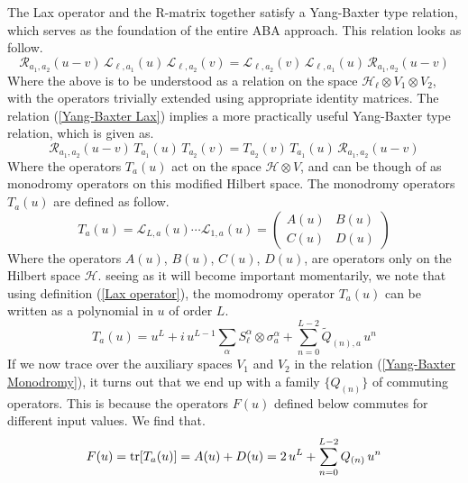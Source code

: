 %
%
The Lax operator and the R-matrix together satisfy a Yang-Baxter type relation, which serves as the foundation of the entire ABA approach. This relation looks as follow.
%
%
\begin{equation}\label{Yang-Baxter Lax}
\mathcal{R}_{a_1,a_2}(u - v) \, \mathcal{L}_{\ell,a_1}(u) \, \mathcal{L}_{\ell,a_2}(v)
=
\mathcal{L}_{\ell,a_2}(v) \, \mathcal{L}_{\ell,a_1}(u) \, \mathcal{R}_{a_1,a_2}(u - v)
\end{equation}
%
%
Where the above is to be understood as a relation on the space $\mathcal{H}_\ell \otimes V_1 \otimes V_2$, with the operators trivially extended using appropriate identity matrices. The relation (\ref{Yang-Baxter Lax}) implies a more practically useful Yang-Baxter type relation, which is given as.
%
%
\begin{equation}\label{Yang-Baxter Monodromy}
\mathcal{R}_{a_1,a_2}(u - v) \, T_{a_1}(u) \, T_{a_2}(v)
=
T_{a_2}(v) \, T_{a_1}(u) \, \mathcal{R}_{a_1,a_2}(u - v)
\end{equation}
%
%
Where the operators $T_a(u)$ act on the space $\mathcal{H} \otimes V$, and can be though of as monodromy operators on this modified Hilbert space. The monodromy operators $T_a(u)$ are defined as follow.
%
%
\begin{equation}
T_a(u) = \mathcal{L}_{L,a}(u) \cdots \mathcal{L}_{1,a}(u) =
\left(
\begin{array}{cc}
A(u) & B(u) \\
C(u) & D(u)
\end{array}
\right)
\end{equation}
%
%
Where the operators $A(u)$, $B(u)$, $C(u)$, $D(u)$, are operators only on the Hilbert space $\mathcal{H}$. seeing as it will become important momentarily, we note that using definition (\ref{Lax operator}), the momodromy operator $T_a(u)$ can be written as a polynomial in $u$ of order $L$.
%
%
\begin{equation}
T_a(u)
=
u^L
+
i \, u^{L-1} \sum_{\alpha} S_\ell^\alpha \otimes \sigma^\alpha_{a}
+
\sum_{n=0}^{L-2} \tilde{Q}_{(n),a} \, u^n
\end{equation}
%
%
If we now trace over the auxiliary spaces $V_1$ and $V_2 $ in the relation (\ref{Yang-Baxter Monodromy}), it turns out that we end up with a family $\{ Q_{(n)} \}$ of commuting operators. This is because the operators $F(u)$ defined below commutes for different input values. We find that.
%
%
\begin{equation}
F(u) = \tr[ T_a(u) ] = A(u) + D(u) =
2 \, u^L + \sum_{n=0}^{L-2} Q_{(n)} \, u^n
\end{equation}
